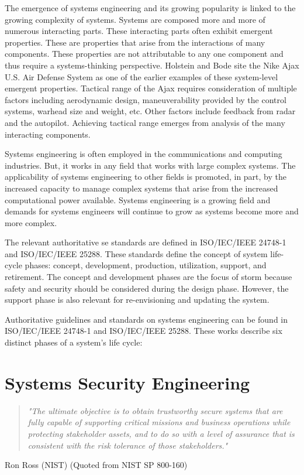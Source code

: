 \documentclass[../../main/main.tex]{subfiles}
\begin{document}
The emergence of systems engineering and its growing popularity is linked to the growing complexity of systems.  Systems are composed more and more of numerous interacting parts.  These interacting parts often exhibit emergent properties.  These are properties that arise from the interactions of many components.  These properties are not attributable to any one component and thus require a systems-thinking perspective. Holstein and Bode site the Nike Ajax U.S. Air Defense System as one of the earlier examples of these system-level emergent properties. Tactical range of the Ajax requires consideration of multiple factors including aerodynamic design, maneuverability provided by the control systems, warhead size and weight, etc.  Other factors include feedback from radar and the autopilot.  Achieving tactical range emerges from analysis of the many interacting components.  

Systems engineering is often employed in the communications and computing industries. But, it works in any field that works with large complex systems.  The applicability of systems engineering to other fields is promoted, in part, by the increased capacity to manage complex systems that arise from the increased computational power available.  Systems engineering is a growing field and demands for systems engineers will continue to grow as systems become more and more complex.

The relevant authoritative \gls{se} standards are defined in ISO/IEC/IEEE 24748-1 \cite{}and ISO/IEC/IEEE 25288.  These standards define the concept of system life-cycle phases: concept, development, production, utilization, support, and retirement.  The concept and development phases are the focus of \gls{storm} because safety and security should be considered during the design phase.  However, the support phase is also relevant for re-envisioning and updating the system.  


Authoritative guidelines and standards on systems engineering can be found in ISO/IEC/IEEE 24748-1 and ISO/IEC/IEEE 25288.  These works describe six distinct phases of a system's life cycle: 
\section{Systems Security Engineering}\label{sesc:sse}
\begin{quote}
\textit{"The ultimate objective is to obtain trustworthy secure systems that are fully capable of supporting critical missions and business operations while protecting stakeholder assets, and to do so with a level of assurance that is consistent with the risk tolerance of those stakeholders."}
\end{quote}
Ron Ross (NIST) (Quoted from NIST SP 800-160)
\end{document}

